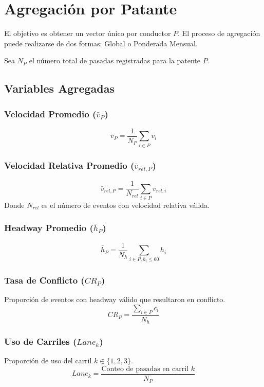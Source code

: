 \section{Agregación por Patante}
El objetivo es obtener un vector único por conductor $P$. El proceso de agregación puede realizarse de dos formas: Global o Ponderada Mensual.

Sea $N_P$ el número total de pasadas registradas para la patente $P$.

\subsection{Variables Agregadas}

\subsubsection{Velocidad Promedio ($\bar{v}_P$)}
\begin{equation}
    \bar{v}_P = \frac{1}{N_P} \sum_{i \in P} v_i
\end{equation}

\subsubsection{Velocidad Relativa Promedio ($\bar{v}_{rel, P}$)}
\begin{equation}
    \bar{v}_{rel, P} = \frac{1}{N_{rel}} \sum_{i \in P} v_{rel, i}
\end{equation}
Donde $N_{rel}$ es el número de eventos con velocidad relativa válida.

\subsubsection{Headway Promedio ($\bar{h}_P$)}
\begin{equation}
    \bar{h}_P = \frac{1}{N_{h}} \sum_{i \in P, h_i \le 60} h_i
\end{equation}

\subsubsection{Tasa de Conflicto ($CR_P$)}
Proporción de eventos con headway válido que resultaron en conflicto.
\begin{equation}
    CR_P = \frac{\sum_{i \in P} c_i}{N_{h}}
\end{equation}

\subsubsection{Uso de Carriles ($Lane_k$)}
Proporción de uso del carril $k \in \{1, 2, 3\}$.
\begin{equation}
    Lane_k = \frac{\text{Conteo de pasadas en carril } k}{N_P}
\end{equation}


